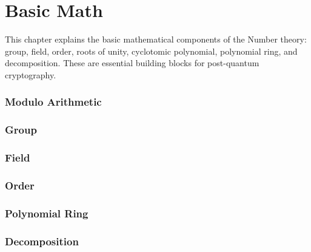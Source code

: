 \documentclass[11pt]{article}
\begin{document}
\clearpage



\part{Basic Math}
\label{part:basic-math}

\renewcommand{\thesection}{A-\arabic{section}}
\setcounter{section}{0}

This chapter explains the basic mathematical components of the Number theory: group, field, order, roots of unity, cyclotomic polynomial, polynomial ring, and decomposition. These are essential building blocks for post-quantum cryptography.

\clearpage

\section{Modulo Arithmetic}
\label{sec:modulo}


\clearpage

\section{Group}
\label{sec:group}



\clearpage

\section{Field}
\label{sec:field}


\clearpage

\section{Order}
\label{sec:order}




\clearpage

\section{Polynomial Ring}
\label{sec:polynomial-ring}


\clearpage

\section{Decomposition}
\label{sec:decomp}

\end{document}
